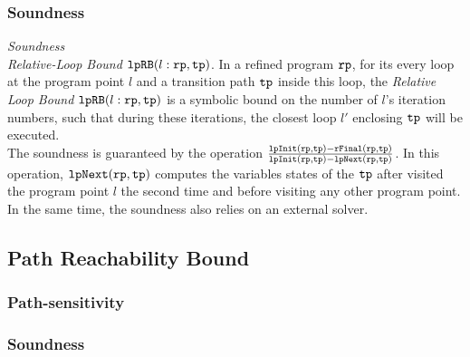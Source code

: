 \subsubsection{Soundness}

\emph{Soundness}
\\
\emph{Relative-Loop Bound} $\mathtt{lpRB}(l: \mathtt{rp}, \mathtt{tp})$. In a refined program $\mathtt{rp}$,
for its every loop at the program point $l$ and a transition path $\mathtt{tp}$ inside this loop,
the \emph{Relative Loop Bound} $\mathtt{lpRB}(l: \mathtt{rp}, \mathtt{tp})$ is a symbolic bound
on the number of $l$'s iteration numbers,
such that during these iterations, the closest loop $l'$ enclosing $\mathtt{tp}$ will be executed.
\\
The soundness is guaranteed by the operation
 $\frac{\mathtt{lpInit}(\mathtt{rp}, \mathtt{tp}) - \mathtt{rFinal}(\mathtt{rp}, \mathtt{tp})}{\mathtt{lpInit}(\mathtt{rp}, \mathtt{tp}) - \mathtt{lpNext}(\mathtt{rp}, \mathtt{tp})}$.
 In this operation, $\mathtt{lpNext}(\mathtt{rp}, \mathtt{tp})$ computes the variables states of the $\mathtt{tp}$
after visited the program point $l$ the second time and before visiting any other program point.
In the same time, the soundness also relies on an external solver. 



\subsection{Path Reachability Bound}
\subsubsection{Path-sensitivity}
\subsubsection{Soundness}


